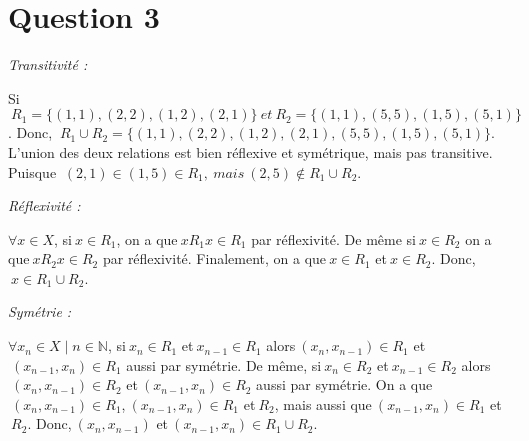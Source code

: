 \section*{Question 3}
\noindent
\emph{Transitivité :}

Si$\ R_1 = \{(1,1), (2,2), (1,2), (2,1)\}\ et\ R_2 = \{(1,1), (5,5), (1,5), (5,1)\}$. Donc, $\ R_1 \cup R_2 = \{(1,1), (2,2), (1,2), (2,1), (5,5), (1,5), (5,1)\}$. L'union des  deux relations est bien réflexive et symétrique, mais pas transitive. Puisque $\ (2,1)\in (1,5) \in R_1,\ mais\ (2,5) \notin R_1 \cup R_2$.

\bigskip

\emph{Réflexivité :}

$\forall x\in X$, si$\ x\in R_1$, on a que$\ xR_1x \in R_1$ par réflexivité. De même si$\ x\in R_2$ on a que$\ xR_2x \in R_2$ par réflexivité. Finalement, on a que$\ x \in R_1$ et$\ x \in R_2$. Donc,$\ x \in R_1\cup R_2$.

\bigskip

\emph{Symétrie : }

$\forall x_n \in X \mid n \in \mathbb{N}$, si$\ x_n \in R_1$ et$\ x_{n-1} \in R_1$ alors$\ (x_n,x_{n-1}) \in R_1$ et$\ (x_{n-1}, x_n) \in R_1$ aussi par symétrie. De même, si$\ x_n \in R_2$ et$\ x_{n-1} \in R_2$ alors$\ (x_n,x_{n-1}) \in R_2$ et$\ (x_{n-1}, x_n) \in R_2$ aussi par symétrie. On a que$\ (x_n, x_{n-1}) \in R_1$,$\ (x_{n-1}, x_n) \in R_1$ et$\ R_2$, mais aussi que$\ (x_{n-1}, x_n) \in R_1$ et$\ R_2$. Donc,$\ (x_n, x_{n-1})$ et$\ (x_{n-1}, x_n) \in R_1 \cup R_2$.